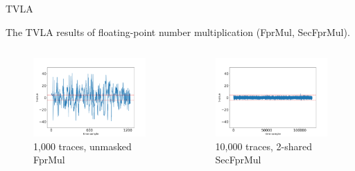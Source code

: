 \begin{frame}{TVLA}

The TVLA results of floating-point number multiplication (FprMul, SecFprMul).

\begin{columns}[T]
\begin{figure}
\includegraphics[width=\textwidth]{Figure/tvla/fprmul_1k.png}
\vspace{-20pt}
\caption{1,000 traces, unmasked FprMul}
\end{figure}

\begin{figure}
\includegraphics[width=\textwidth]{figure/tvla/1013_SecFprMul_2shares_10k.png}
\vspace{-20pt}
\caption{10,000 traces, 2-shared SecFprMul}
\end{figure}


\end{columns}
\end{frame}
